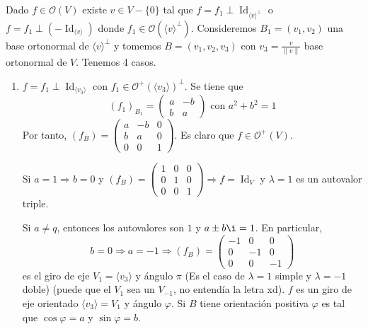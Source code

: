 \documentclass[12pt, a4paper, ones, notitlepage, openany,titlepage]{article}
\begin{document}
Dado $f \in \mathcal{O}(V)$ existe $v \in V-\{0\}$ tal que $f 
= f_1 \perp \operatorname{Id}_{\langle v \rangle^\perp}$ o $f = f_1 \perp (-\operatorname{Id}_{\langle v \rangle})$ donde $f_1 \in \mathcal{O}(\langle v \rangle^\perp)$. Consideremos $B_1 = (v_1, v_2)$ una base ortonormal de $\langle v \rangle^\perp$ y tomemos $B = (v_1,v_2,v_3)$ con $\displaystyle v_3 = \frac{v}{\|v\|}$ base ortonormal de $V$. Tenemos 4 casos.
\begin{enumerate}[label=(\arabic*)]
	\item $f = f_1 \perp \operatorname{Id}_{\langle v_3 \rangle}$ con $f_1 \in \mathcal{O}^+(\langle v_3 \rangle)^\perp$. Se tiene que
	$$
	\left(f_1\right)_{B_1} = \begin{pmatrix}
		a & -b \\
		b & a
	\end{pmatrix} \text{ con } a^2 + b^2 = 1
	$$
	Por tanto, $\displaystyle \left(f_B\right) = \begin{pmatrix}
		a & -b & 0 \\
		b & a & 0 \\
		0 & 0 & 1
	\end{pmatrix}$. Es claro que $f \in \mathcal{O}^+(V)$.
	
	Si $a = 1 \Longrightarrow b = 0$ y $\displaystyle \left(f_B\right) = \begin{pmatrix}
		1 & 0 & 0 \\
		0 & 1 & 0 \\
		0 & 0 & 1
	\end{pmatrix} \Longrightarrow f = \operatorname{Id}_V$ y $\lambda = 1$ es un autovalor triple.
	
	Si $a \neq q$, entonces los autovalores son $1$ y $a \pm b \i = 1$. En particular,
	$$
	b = 0 \Longrightarrow a = -1 \Longrightarrow \left(f_B\right) = \begin{pmatrix}
		-1 & 0 & 0 \\
		0 & -1 & 0 \\
		0 & 0 & -1
	\end{pmatrix}
	$$
	es el giro de eje $V_1 = \langle v_3 \rangle$ y ángulo $\pi$ (Es el caso de $\lambda = 1$ simple y $\lambda = -1$ doble) (puede que el $V_1$ sea un $V_{-1}$, no entendía la letra xd). $f$ es un giro de eje orientado $\langle v_3 \rangle = V_1$ y ángulo $\varphi$. Si $B$ tiene orientación positiva $\varphi$ es tal que $\cos \varphi = a$ y $\sin \varphi = b$.
	

\end{enumerate}
\end{document}
